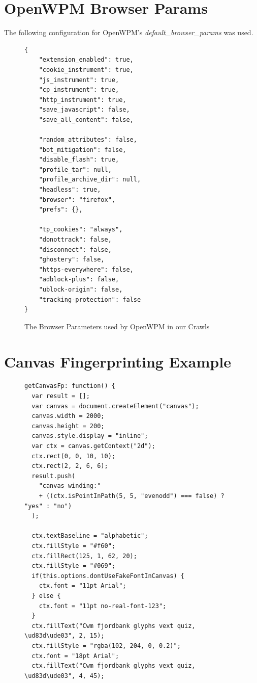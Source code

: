 \documentclass[
    fontsize=12pt,
    headings=small,
    parskip=half,
    bibliography=totoc,
    numbers=noenddot,
    open=any
    ]{scrreprt}
\begin{document}
\begin{appendices}

\chapter{OpenWPM Browser Params}
The following configuration for OpenWPM's \textit{default\_browser\_params} was used.


\begin{figure}
\label{app:params}
\begin{verbatim}
{
    "extension_enabled": true,
    "cookie_instrument": true,
    "js_instrument": true,
    "cp_instrument": true,
    "http_instrument": true,
    "save_javascript": false,
    "save_all_content": false,

    "random_attributes": false,
    "bot_mitigation": false,
    "disable_flash": true,
    "profile_tar": null,
    "profile_archive_dir": null,
    "headless": true,
    "browser": "firefox",
    "prefs": {},

    "tp_cookies": "always",
    "donottrack": false,
    "disconnect": false,
    "ghostery": false,
    "https-everywhere": false,
    "adblock-plus": false,
    "ublock-origin": false,
    "tracking-protection": false
}
\end{verbatim}
\caption{The Browser Parameters used by OpenWPM in our Crawls}
\end{figure}


\chapter{Canvas Fingerprinting Example}
\begin{figure}
\begin{verbatim}
getCanvasFp: function() {
  var result = [];
  var canvas = document.createElement("canvas");
  canvas.width = 2000;
  canvas.height = 200;
  canvas.style.display = "inline";
  var ctx = canvas.getContext("2d");
  ctx.rect(0, 0, 10, 10);
  ctx.rect(2, 2, 6, 6);
  result.push(
    "canvas winding:"
    + ((ctx.isPointInPath(5, 5, "evenodd") === false) ? "yes" : "no")
  );

  ctx.textBaseline = "alphabetic";
  ctx.fillStyle = "#f60";
  ctx.fillRect(125, 1, 62, 20);
  ctx.fillStyle = "#069";
  if(this.options.dontUseFakeFontInCanvas) {
    ctx.font = "11pt Arial";
  } else {
    ctx.font = "11pt no-real-font-123";
  }
  ctx.fillText("Cwm fjordbank glyphs vext quiz, \ud83d\ude03", 2, 15);
  ctx.fillStyle = "rgba(102, 204, 0, 0.2)";
  ctx.font = "18pt Arial";
  ctx.fillText("Cwm fjordbank glyphs vext quiz, \ud83d\ude03", 4, 45);


\end{verbatim}
\end{figure}
\end{appendices}
\end{document}
